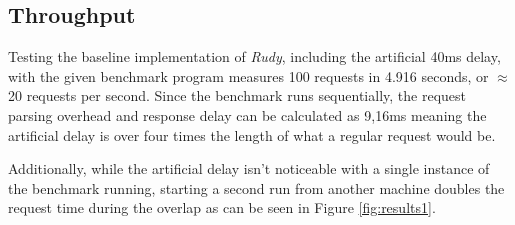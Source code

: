 \documentclass[a4paper, 11pt]{article}
\begin{document}
\subsection{Throughput}

Testing the baseline implementation of \textit{Rudy}, including the artificial 40ms delay, with the given benchmark program measures 100 requests in 4.916 seconds, or $\approx$20 requests per second.
Since the benchmark runs sequentially, the request parsing overhead and response delay can be calculated as 9,16ms meaning the artificial delay is over four times the length of what a regular request would be.

Additionally, while the artificial delay isn't noticeable with a single instance of the benchmark running, starting a second run from another machine doubles the request time during the overlap as can be seen in Figure \ref{fig:results1}.
\end{document}
